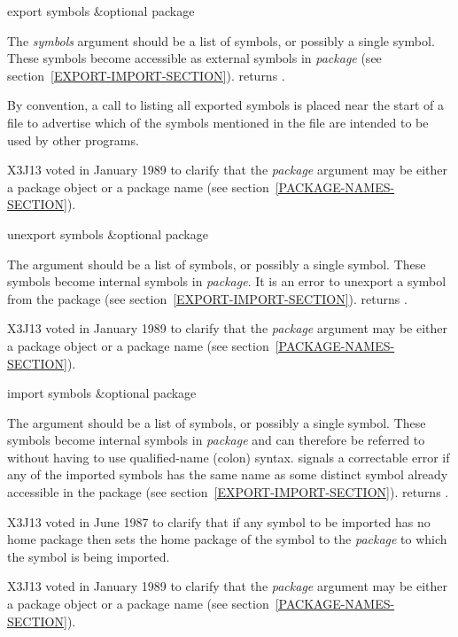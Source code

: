 \begin{defun}[Function]
export symbols &optional package

The {\it symbols} argument should be a list of symbols, or possibly a single
symbol.  These symbols become accessible as external symbols in
{\it package} (see section~\ref{EXPORT-IMPORT-SECTION}).
 returns {\true}.

By convention, a call to  listing all exported symbols is
placed near the start of a file to advertise which of the symbols
mentioned in the file are intended to be used by other programs.

\begin{new}
X3J13 voted in January 1989
to clarify that the {\it package} argument may be either a package object
or a package name (see section~\ref{PACKAGE-NAMES-SECTION}).
\end{new}
\end{defun}

\begin{defun}[Function]
unexport symbols &optional package

The argument should be a list of symbols, or possibly a single symbol.
These symbols become internal symbols in {\it package}.
It is an error to unexport a symbol from the  package
(see section~\ref{EXPORT-IMPORT-SECTION}).
 returns {\true}.

\begin{new}
X3J13 voted in January 1989
to clarify that the {\it package} argument may be either a package object
or a package name (see section~\ref{PACKAGE-NAMES-SECTION}).
\end{new}
\end{defun}

\begin{defun}[Function]
import symbols &optional package

The argument should be a list of symbols, or possibly a single symbol.
These symbols become internal symbols in {\it package} and can therefore
be referred to without having to use qualified-name (colon) syntax.
 signals a
correctable error if any of the imported symbols has the same name as
some distinct symbol already accessible in the package
(see section~\ref{EXPORT-IMPORT-SECTION}).
 returns {\true}.

\begin{newer}
X3J13 voted in June 1987 
to clarify that if any symbol to be imported has no home package
then  sets the home package of the symbol to the
{\it package} to which the symbol is being imported.
\end{newer}

\begin{new}
X3J13 voted in January 1989
to clarify that the {\it package} argument may be either a package object
or a package name (see section~\ref{PACKAGE-NAMES-SECTION}).
\end{new}
\end{defun}

